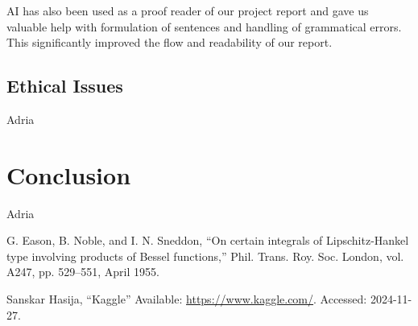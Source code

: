 \documentclass[conference]{IEEEtran}
\begin{document}
AI has also been used as a proof reader of our project report and gave us valuable help with formulation of sentences and handling of grammatical errors. This significantly improved the flow and readability of our report. 

\subsection{Ethical Issues}
Adria



\section*{Conclusion}
Adria

\begin{thebibliography}{00}
 G. Eason, B. Noble, and I. N. Sneddon, ``On certain integrals of Lipschitz-Hankel type involving products of Bessel functions,'' Phil. Trans. Roy. Soc. London, vol. A247, pp. 529--551, April 1955.

 Sanskar Hasija, ``Kaggle'' Available:  \href{https://www.kaggle.com/code/odins0n/emotion-detection/notebook?scriptVersionId=84496369}{https://www.kaggle.com/}. Accessed: 2024-11-27.


\end{thebibliography}
\end{document}
